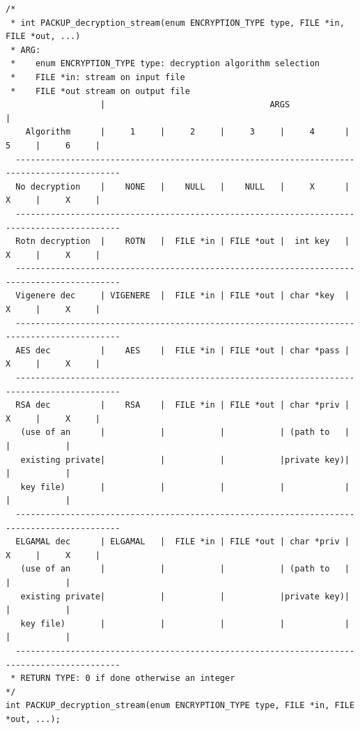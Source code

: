 \begin{lstlisting}[style=CStyleSmall]
    \end{lstlisting}
    \newpage
    \begin{lstlisting}[style=CStyleSmall]
/*
 * int PACKUP_decryption_stream(enum ENCRYPTION_TYPE type, FILE *in, FILE *out, ...)
 * ARG: 
 *    enum ENCRYPTION_TYPE type: decryption algorithm selection
 *    FILE *in: stream on input file
 *    FILE *out stream on output file
                   |                                 ARGS                                   |
    Algorithm      |     1     |     2     |     3     |     4      |     5     |     6     |
  -------------------------------------------------------------------------------------------
  No decryption    |    NONE   |    NULL   |    NULL   |     X      |     X     |     X     |
  -------------------------------------------------------------------------------------------
  Rotn decryption  |    ROTN   |  FILE *in | FILE *out |  int key   |     X     |     X     |
  -------------------------------------------------------------------------------------------
  Vigenere dec     | VIGENERE  |  FILE *in | FILE *out | char *key  |     X     |     X     |
  -------------------------------------------------------------------------------------------
  AES dec          |    AES    |  FILE *in | FILE *out | char *pass |     X     |     X     |
  -------------------------------------------------------------------------------------------
  RSA dec          |    RSA    |  FILE *in | FILE *out | char *priv |     X     |     X     |
   (use of an      |           |           |           | (path to   |           |           |
   existing private|           |           |           |private key)|           |           |
   key file)       |           |           |           |            |           |           |
  -------------------------------------------------------------------------------------------
  ELGAMAL dec      | ELGAMAL   |  FILE *in | FILE *out | char *priv |     X     |     X     |
   (use of an      |           |           |           | (path to   |           |           |
   existing private|           |           |           |private key)|           |           |
   key file)       |           |           |           |            |           |           |
  -------------------------------------------------------------------------------------------
 * RETURN TYPE: 0 if done otherwise an integer
*/
int PACKUP_decryption_stream(enum ENCRYPTION_TYPE type, FILE *in, FILE *out, ...);
    \end{lstlisting}
	
